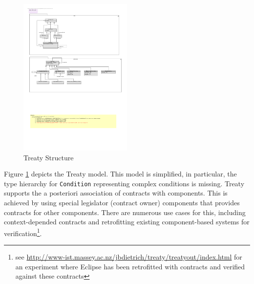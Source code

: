 \documentclass{llncs}
\begin{document}
\begin{figure}[t]
\centering
\includegraphics[width=0.5\textwidth]{RoleModel1.pdf}
\caption{Treaty Structure}
\label{fig1}
\end{figure}

Figure \ref{fig1} depicts the Treaty model. This model is simplified, in particular, the type hierarchy for \texttt{Condition} representing complex conditions is missing. Treaty supports the a posteriori association of contracts with components. 
This is achieved by using special legislator (contract owner) components that provides contracts for other components.  There are numerous use cases for this, including context-depended contracts and retrofitting existing component-based systems for verification\footnote{see \url{http://www-ist.massey.ac.nz/jbdietrich/treaty/treatyout/index.html} for an experiment where Eclipse has been retrofitted with contracts and verified against these contracts}.   
 
\end{document}
